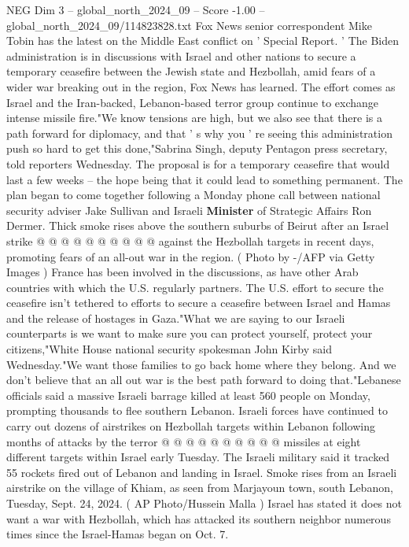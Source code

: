 \begin{textsample}{NEG Dim 3 – global\_north\_2024\_09 – Score -1.00 – global\_north\_2024\_09/114823828.txt}  \label{ex:f3_neg_296}
Fox News senior correspondent Mike Tobin has the latest on the Middle East conflict on ' Special Report. ' The Biden administration is in discussions with Israel and other nations to secure a temporary ceasefire between the Jewish state and Hezbollah, amid fears of a wider war breaking out in the region, Fox News has learned.
The effort comes as Israel and the Iran-backed, Lebanon-based terror group continue to exchange intense missile fire."We know tensions are high, but we also see that there is a path forward for diplomacy, and that ' s why you ' re seeing this administration push so hard to get this done,"Sabrina Singh, deputy Pentagon press secretary, told reporters Wednesday.
The proposal is for a temporary ceasefire that would last a few weeks -- the hope being that it could lead to something permanent.
The plan began to come together following a Monday phone call between national security adviser Jake Sullivan and Israeli \textbf{Minister} of Strategic Affairs Ron Dermer.
Thick smoke rises above the southern suburbs of Beirut after an Israel strike @ @ @ @ @ @ @ @ @ @ against the Hezbollah targets in recent days, promoting fears of an all-out war in the region. ( Photo by -/AFP via Getty Images ) France has been involved in the discussions, as have other Arab countries with which the U.S. regularly partners.
The U.S. effort to secure the ceasefire isn't tethered to efforts to secure a ceasefire between Israel and Hamas and the release of hostages in Gaza."What we are saying to our Israeli counterparts is we want to make sure you can protect yourself, protect your citizens,"White House national security spokesman John Kirby said Wednesday."We want those families to go back home where they belong.
And we don't believe that an all out war is the best path forward to doing that."Lebanese officials said a massive Israeli barrage killed at least 560 people on Monday, prompting thousands to flee southern Lebanon.
Israeli forces have continued to carry out dozens of airstrikes on Hezbollah targets within Lebanon following months of attacks by the terror @ @ @ @ @ @ @ @ @ @ missiles at eight different targets within Israel early Tuesday.
The Israeli military said it tracked 55 rockets fired out of Lebanon and landing in Israel.
Smoke rises from an Israeli airstrike on the village of Khiam, as seen from Marjayoun town, south Lebanon, Tuesday, Sept. 24, 2024. ( AP Photo/Hussein Malla ) Israel has stated it does not want a war with Hezbollah, which has attacked its southern neighbor numerous times since the Israel-Hamas began on Oct. 7.

\end{textsample}
